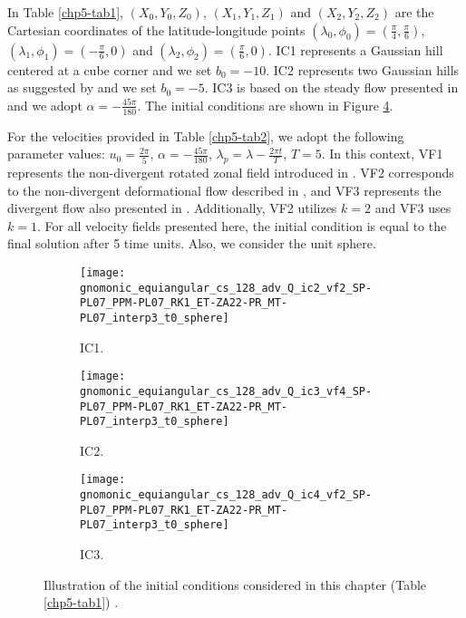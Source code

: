In Table \ref{chp5-tab1}, $(X_0,Y_0,Z_0)$, $(X_1,Y_1,Z_1)$ and $(X_2,Y_2,Z_2)$ are the Cartesian coordinates of the latitude-longitude points
$(\lambda_0,\phi_0) = (\frac{\pi}{4},\frac{\pi}{6})$,
$(\lambda_1,\phi_1) = (-\frac{\pi}{6},0)$ and
$(\lambda_2,\phi_2) = ( \frac{\pi}{6},0)$.
IC1 represents a Gaussian hill centered at a cube corner and we set $b_0 = -10$.
IC2 represents two Gaussian hills as suggested by \citet{nair:2010} and we set $b_0 = -5$.
IC3 is based on the steady flow presented in \citet{will:1992} and we adopt $\alpha=-\frac{45\pi}{180}$.
The initial conditions are shown in Figure \ref{chp5-ic}.

For the velocities provided in Table \ref{chp5-tab2}, we adopt the following parameter values:
$u_0 = \frac{2\pi}{5}$, $\alpha=-\frac{45\pi}{180}$, $\lambda_p=\lambda-\frac{2\pi t}{T}$, $T=5$.
In this context, VF1 represents the non-divergent rotated zonal field introduced in \citet{will:1992}.
VF2 corresponds to the non-divergent deformational flow described in \citet{nair:2010},
and VF3 represents the divergent flow also presented in \citet{nair:2010}.
Additionally, VF2 utilizes $k=2$ and VF3 uses $k=1$.
For all velocity fields presented here, the initial condition is equal to the final solution after 5 time units.
Also, we consider the unit sphere.

\begin{figure}[!htb]
	\centering
	\begin{subfigure}{0.3\textwidth}
		\centering
		\texttt{[image: gnomonic\_equiangular\_cs\_128\_adv\_Q\_ic2\_vf2\_SP-PL07\_PPM-PL07\_RK1\_ET-ZA22-PR\_MT-PL07\_interp3\_t0\_sphere]}
		\caption{IC1. \label{chp5-ic1}}
	\end{subfigure}
	\begin{subfigure}{0.3\textwidth}
		\centering
		\texttt{[image: gnomonic\_equiangular\_cs\_128\_adv\_Q\_ic3\_vf4\_SP-PL07\_PPM-PL07\_RK1\_ET-ZA22-PR\_MT-PL07\_interp3\_t0\_sphere]}
		\caption{IC2. \label{chp5-ic2}}
	\end{subfigure}
	\begin{subfigure}{0.3\textwidth}
		\centering
		\texttt{[image: gnomonic\_equiangular\_cs\_128\_adv\_Q\_ic4\_vf2\_SP-PL07\_PPM-PL07\_RK1\_ET-ZA22-PR\_MT-PL07\_interp3\_t0\_sphere]}
		\caption{IC3. \label{chp5-ic3}}
	\end{subfigure}
	\caption{ Illustration of the initial conditions considered in this chapter (Table \ref{chp5-tab1}) .\label{chp5-ic}}
\end{figure}

